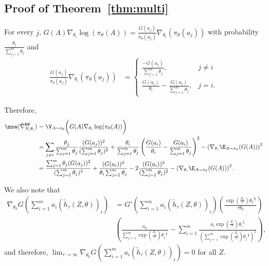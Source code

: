 \subsection{Proof of Theorem~\ref{thm:multi}}
\label{sec:proof-thm-multi}



 For every $j$,
$G(A) \nabla_{\theta_i} \log(\pi_\theta(A)) = \frac{G(a_j)}{\pi_\theta(a_j)}\nabla_{\theta_i} (\pi_\theta(a_j))$
with probability $\frac{\theta_j}{\sum_{j=1}^m \theta_j}$
and
\begin{align*}
\frac{G(a_j)}{\pi_\theta(a_j)}\nabla_{\theta_i} (\pi_\theta(a_j))
&= \begin{cases}
\frac{-G(a_j)}{\sum_{j=1}^m\theta_j}, & j \ne i \\ 
\frac{G(a_i)}{\theta_i} - \frac{G(a_i)}{\sum_{j=1}^m\theta_j},  & j =i.
\end{cases}
\end{align*}

Therefore,
\begin{align}
\mse(\hat{\nabla}^{\mathsf{RF}}_{N,\theta_i})
 & =   \V_{A \sim \pi_\theta} \bigg(G(A) \nabla_{\theta_i} \log(\pi_\theta(A)) \bigg) \nonumber \\
  & = \sum_{j\neq i} \frac{\theta_j}{\sum_{j=1}^m \theta_j} \frac{(G(a_j))^2}{(\sum_{j=1}^m\theta_j)^2} +  \frac{\theta_i}{\sum_{j=1}^m \theta_j} \left( \frac{G(a_i)}{\theta_i} - \frac{G(a_i)}{\sum_{j=1}^m\theta_j} \right)^2 - \left(\nabla_{\theta_i} \E_{A\sim \pi_\theta}(G(A))\right)^2  \nonumber  
\\ &= \frac{\sum_{j=1}^m\theta_j(G(a_j))^2}{(\sum_{j=1}^m\theta_j)^3} + \frac{(G(a_i))^2}{\theta_i\sum_{j=1}^m \theta_j} - 2 \frac{(G(a_i))^2}{(\sum_{j=1}^m \theta_j)^2}  - \left(\nabla_{\theta_i} \E_{A\sim \pi_\theta}(G(A))\right)^2.
\label{eqn:mse-reinforce}
\end{align}






We also note that
\begin{align*}
    \nabla_{\theta_k}{G\left(\sum_{i=1}^ma_i (\tilde{h}_\tau(Z,\theta))_i\right)} &= {G'\left(\sum_{i=1}^ma_i (\tilde{h}_\tau(Z,\theta))_i\right)}\left(\frac{\exp\left(\frac{Z_k}{\tau}\right) {\theta_k}^{\frac{1}{\tau}}}{\tau \theta_k}\right) \\& \left( \frac{a_k}{\sum_{j=1}^m{\exp\left(\frac{Z_j}{\tau}\right)}{\theta_j}^{\frac{1}{\tau}}} - \sum_{i=1}^m\frac{a_i\exp\left(\frac{Z_i}{\tau}\right){\theta_i}^{\frac{1}{\tau}}}{(\sum_{j=1}^m{\exp\left(\frac{Z_j}{\tau}\right)}{\theta_j}^{\frac{1}{\tau}})^2}\right),
\end{align*}
and therefore, 
$\lim_{\tau \to \infty} \nabla_{\theta_k}{G\left(\sum_{i=1}^ma_i (\tilde{h}_\tau(Z,\theta))_i\right)} = 0 $ for all $Z$.

